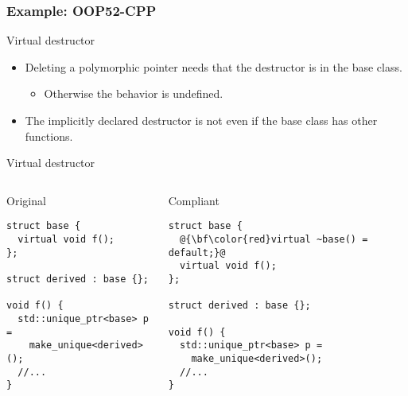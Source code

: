 \subsubsection{Example: OOP52-CPP}

\begin{frame}[t]{Virtual destructor}
\begin{itemize}
  \item Deleting a polymorphic pointer needs that the destructor is
         in the base class.
    \begin{itemize}
      \item Otherwise the behavior is undefined.
    \end{itemize}

  \vfill
  \item The implicitly declared destructor is not  even
        if the base class has other  functions.
\end{itemize}
\end{frame}

\begin{frame}[t,fragile]{Virtual destructor}
\begin{columns}

\begin{block}{Original}
\begin{lstlisting}
struct base {
  virtual void f();
};

struct derived : base {};

void f() {
  std::unique_ptr<base> p = 
    make_unique<derived>();
  //...
}
\end{lstlisting}
\end{block}

\pause
{}
\begin{block}{Compliant}
\begin{lstlisting}[escapechar=@]
struct base {
  @{\bf\color{red}virtual ~base() = default;}@
  virtual void f();
};

struct derived : base {};

void f() {
  std::unique_ptr<base> p = 
    make_unique<derived>();
  //...
}
\end{lstlisting}
\end{block}

\end{columns}
\end{frame}

